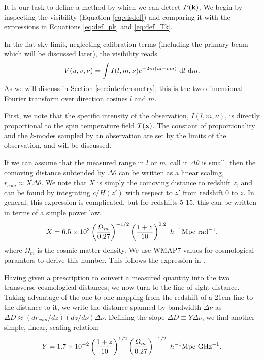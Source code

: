 It is our task to define a method by which we can detect $P(\mathbf{k})$.  We begin by inspecting the visibility 
(Equation \ref{eq:visdef}) and comparing it with the expressions in Equations \ref{eq:def_pk} and \ref{eq:def_Tk}. 

In the flat sky limit, neglecting calibration terms (including the primary beam which will be
discussed later), the visibility reads
\begin{equation}
  V(u,v,\nu) = \int I(l,m,\nu) e^{-2\pi i (ul+vm)}\ \mathrm{d}l\ \mathrm{d}m.
\end{equation}
As we will discuss in Section \ref{sec:interferometry}, this is the two-dimensional Fourier transform 
over direction cosines $l$ and $m$.

First, we note that the specific intensity of the observation, $I(l,m,\nu)$, is directly
proportional to the spin temperature field $T(\mathbf{x})$. The constant of proportionality and 
the $k$-modes sampled by an observation are set by the limits of the observation, and will be
discussed. 

If we can assume that the measured range in $l$ or $m$, call it $\Delta\theta$ is small, then the
comoving distance subtended by $\Delta\theta$ can be written as a linear scaling, 
$r_{com} \approx X\Delta\theta$. We note that $X$ is simply the comoving distance to redshift $z$, 
and can be found by integrating $c/H(z')$ with respect to $z'$ from redshift 0 to $z$. In general, 
this expression is complicated, but for redshifts 5-15, this can be written in terms of a simple 
power law.
\begin{equation}
  X = 6.5\times10^3\left(\frac{\Omega_m}{0.27}\right)^{-1/2}
  \left(\frac{1+z}{10}\right)^{0.2}\ h^{-1}{\rm Mpc}\ {\rm rad}^{-1},
  \label{eq:def_X}
\end{equation}
where $\Omega_m$ is the cosmic matter density. We use WMAP7 values for cosmological paramters
\cite{Komatsu2009} to derive this number. This follows the expression in \citet{FOB}.

Having given a prescription to convert a measured quantity into the two transverse cosmological
distances, we now turn to the line of sight distance. Taking advantage of the one-to-one mapping
from the redshift of a 21cm line to the distance to it, we write the distance spanned by bandwidth
$\Delta\nu$ as $\Delta D \approx (dr_{com}/dz)(dz/d\nu)\Delta\nu$. Defining the slope 
$\Delta D \equiv Y\Delta\nu$, we find another simple, linear, scaling relation: 
\begin{equation}
  Y = 1.7\times10^{-2}\left(\frac{1+z}{10}\right)^{1/2}\left(\frac{\Omega_m}{0.27}\right)^{-1/2}\
  h^{-1}{\rm Mpc}\ {\rm GHz}^{-1}.
  \label{eq:def_Y}
\end{equation}

